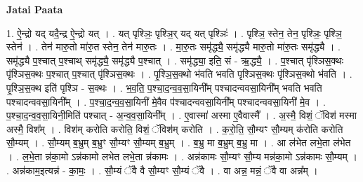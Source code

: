 \documentclass[17pt]{extarticle}
\begin{document}
\textbf{Jatai Paata} \newline

1. ऐ॒न्द्रो यद् यदै॒न्द्र ऐ॒न्द्रो यत् । . यत् पृश्ञिः॒ पृश्ञि॒र् यद् यत् पृश्ञिः॑ । . पृश्ञि॒ स्तेन॒ तेन॒ पृश्ञिः॒ पृश्ञि॒ स्तेन॑ । . तेन॑ मारु॒तो मा॑रु॒त स्तेन॒ तेन॑ मारु॒तः । . मा॒रु॒तः समृ॑द्ध्यै॒ समृ॑द्ध्यै मारु॒तो मा॑रु॒तः समृ॑द्ध्यै । . समृ॑द्ध्यै प॒श्चात् प॒श्चाथ् समृ॑द्ध्यै॒ समृ॑द्ध्यै प॒श्चात् । . समृ॑द्ध्या॒ इति॒ सं - ऋ॒द्ध्यै॒ । . प॒श्चात् पृ॑श्ञिस॒क्थः पृ॑श्ञिस॒क्थः प॒श्चात् प॒श्चात् पृ॑श्ञिस॒क्थः । . पृ॒श्ञि॒स॒क्थो भ॑वति भवति पृश्ञिस॒क्थः पृ॑श्ञिस॒क्थो भ॑वति । . पृ॒श्ञि॒स॒क्थ इति॑ पृश्ञि - स॒क्थः । . भ॒व॒ति॒ प॒श्चा॒द॒न्व॒व॒सा॒यिनी᳚म् पश्चादन्ववसा॒यिनी᳚म् भवति भवति पश्चादन्ववसा॒यिनी᳚म् । . प॒श्चा॒द॒न्व॒व॒सा॒यिनी॑ मे॒वैव प॑श्चादन्ववसा॒यिनी᳚म् पश्चादन्ववसा॒यिनी॑ मे॒व । . प॒श्चा॒द॒न्व॒व॒सा॒यिनी॒मिति॑ पश्चात् - अ॒न्व॒व॒सा॒यिनी᳚म् । . ए॒वास्मा॑ अस्मा ए॒वैवास्मै᳚ । . अ॒स्मै॒ विशं॒ ॅविश॑ मस्मा अस्मै॒ विश᳚म् । . विश॑म् करोति करोति॒ विशं॒ ॅविश॑म् करोति । . क॒रो॒ति॒ सौ॒म्यꣳ सौ॒म्यम् क॑रोति करोति सौ॒म्यम् । . सौ॒म्यम् ब॒भ्रुम् ब॒भ्रुꣳ सौ॒म्यꣳ सौ॒म्यम् ब॒भ्रुम् । . ब॒भ्रु मा ब॒भ्रुम् ब॒भ्रु मा । . आ ल॑भेत लभे॒ता ल॑भेत । . ल॒भे॒ता न्न॑का॒मो ऽन्न॑कामो लभेत लभे॒ता न्न॑कामः । . अन्न॑कामः सौ॒म्यꣳ सौ॒म्य मन्न॑का॒मो ऽन्न॑कामः सौ॒म्यम् । . अन्न॑काम॒इत्यन्न॑ - का॒मः॒ । . सौ॒म्यं ॅवै वै सौ॒म्यꣳ सौ॒म्यं ॅवै । . वा अन्न॒ मन्नं॒ ॅवै वा अन्न᳚म् । \newline
\end{document}

